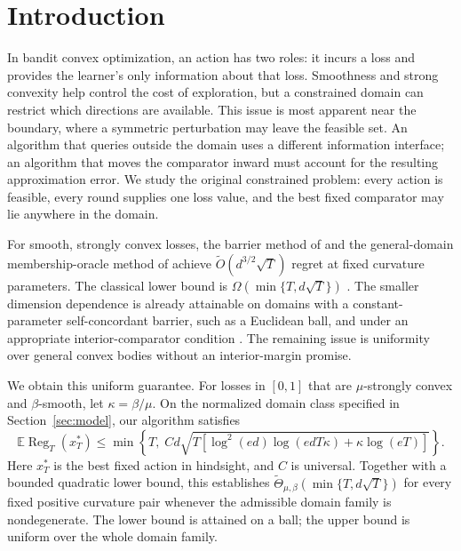 \documentclass[11pt]{article}
\numberwithin{equation}{section}
\newcommand{\E}{\mathbb E}
\newcommand{\Reg}{\operatorname{Reg}}
\newcounter{algorithm}
\theoremstyle{definition}
\theoremstyle{remark}
\begin{document}
\section{Introduction}\label{sec:intro}
In bandit convex optimization, an action has two roles: it incurs a loss and
provides the learner's only information about that loss. Smoothness and strong
convexity help control the cost of exploration, but a constrained domain can
restrict which directions are available. This issue is most apparent near the
boundary, where a symmetric perturbation may leave the feasible set. An
algorithm that queries outside the domain uses a different information
interface; an algorithm that moves the comparator inward must account for the
resulting approximation error. We study the original constrained problem:
every action is feasible, every round supplies one loss value, and the best
fixed comparator may lie anywhere in the domain.

For smooth, strongly convex losses, the barrier method of
\citet{HL14} and the general-domain membership-oracle method of
\citet{Ito20} achieve $\widetilde O(d^{3/2}\sqrt T)$ regret at fixed
curvature parameters. The classical lower bound is
$\Omega(\min\{T,d\sqrt T\})$ \citep{Shamir13}. The smaller dimension
dependence is already attainable on domains with a constant-parameter
self-concordant barrier, such as a Euclidean ball, and under an appropriate
interior-comparator condition \citep{HL14,Ito20}. The remaining issue is
uniformity over general convex bodies without an interior-margin promise.

We obtain this uniform guarantee. For losses in $[0,1]$ that are
$\mu$-strongly convex and $\beta$-smooth, let $\kappa=\beta/\mu$. On the
normalized domain class specified in Section~\ref{sec:model}, our algorithm
satisfies
\begin{equation}\label{eq:intromain}
 \E\Reg_T(x_T^*)
 \leq\min\!\left\{T,\;C d\sqrt{T\left[
 \log^2(ed)\log(edT\kappa)+\kappa\log(eT)\right]}\right\}.
\end{equation}
Here $x_T^*$ is the best fixed action in hindsight, and $C$ is universal.
Together with a bounded quadratic lower bound, this establishes
$\widetilde\Theta_{\mu,\beta}(\min\{T,d\sqrt T\})$ for every fixed
positive curvature pair whenever the admissible domain family is
nondegenerate. The lower bound is attained on a ball; the upper bound is
uniform over the whole domain family.
\end{document}

